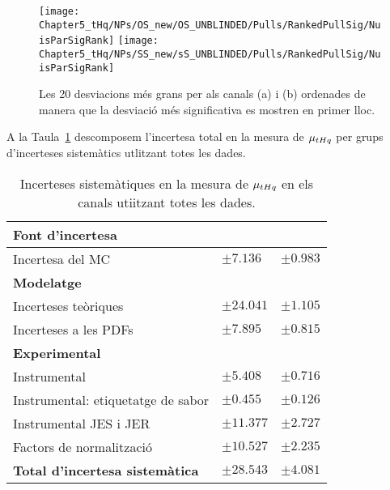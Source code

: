\begin{figure}[h]
\centering
 \texttt{[image: Chapter5\_tHq/NPs/OS\_new/OS\_UNBLINDED/Pulls/RankedPullSig/NuisParSigRank]}
  \texttt{[image: Chapter5\_tHq/NPs/SS\_new/sS\_UNBLINDED/Pulls/RankedPullSig/NuisParSigRank]}
\caption{Les 20 desviacions més grans per als canals (a) \dilepOStau i (b) \dilepSStau ordenades de manera que la desviació més significativa es mostren en primer lloc.} 
\label{fig:Resum:fitToData:RankedPull}
\end{figure}


A la Taula~\ref{tab:Resul:FullData:GroupedSyst} descomposem l'incertesa 
total en la mesura de $\mu_{tHq}$ per grups d'incerteses sistemàtics utlitzant totes les dades.

\begin{table}[h] %
\centering
\begin{tabular}{l|l|l}
\toprule
\textbf{Font d'incertesa} 				& \dilepOStau 		& \dilepSStau \\
\midrule
Incertesa del MC 					& $\pm 7.136$ 		& $\pm 0.983$ \\
\midrule
\textbf{Modelatge} 					& & \\
Incerteses teòriques 					& $\pm 24.041$  	& $\pm 1.105$ \\
Incerteses a les PDFs				& $\pm 7.895$		& $\pm 0.815$ \\
\textbf{Experimental} 				& 				& 	\\
Instrumental 						& $\pm 5.408$  	& $\pm 0.716$ \\
Instrumental: etiquetatge de sabor 		& $\pm 0.455$ 		& $\pm 0.126$ \\
Instrumental JES i JER 				& $\pm 11.377$ 	& $\pm 2.727$ \\
\midrule
Factors de normalització 				& $\pm 10.527$ 	& $\pm 2.235$ \\
\midrule
\textbf{Total d'incertesa sistemàtica} 		& $\pm 28.543$ 	& $\pm 4.081$ \\
\bottomrule
\end{tabular}
\caption{Incerteses sistemàtiques en la mesura de $\mu_{tHq}$ en els canals \dileptau utiitzant totes les dades.}
\label{tab:Resul:FullData:GroupedSyst}
\end{table}



